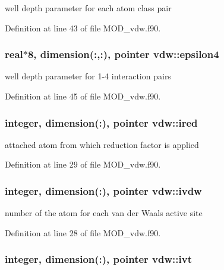 well depth parameter for each atom class pair 



Definition at line 43 of file M\-O\-D\-\_\-vdw.\-f90.

\hypertarget{classvdw_a10411acf35a5a3fdec626d2784b45f51}{
\subsubsection[{epsilon4}]{\setlength{\rightskip}{0pt plus 5cm}real$\ast$8, dimension(\-:,\-:), pointer vdw\-::epsilon4}}\label{classvdw_a10411acf35a5a3fdec626d2784b45f51}


well depth parameter for 1-\/4 interaction pairs 



Definition at line 45 of file M\-O\-D\-\_\-vdw.\-f90.

\hypertarget{classvdw_ae2633d0f849d0257b457b77aff4b7fbd}{
\subsubsection[{ired}]{\setlength{\rightskip}{0pt plus 5cm}integer, dimension(\-:), pointer vdw\-::ired}}\label{classvdw_ae2633d0f849d0257b457b77aff4b7fbd}


attached atom from which reduction factor is applied 



Definition at line 29 of file M\-O\-D\-\_\-vdw.\-f90.

\hypertarget{classvdw_abb457d49a4b465ca67c7f2611dd88331}{
\subsubsection[{ivdw}]{\setlength{\rightskip}{0pt plus 5cm}integer, dimension(\-:), pointer vdw\-::ivdw}}\label{classvdw_abb457d49a4b465ca67c7f2611dd88331}


number of the atom for each van der Waals active site 



Definition at line 28 of file M\-O\-D\-\_\-vdw.\-f90.

\hypertarget{classvdw_a7820644a836b2f500bd9ca9a209b8618}{
\subsubsection[{ivt}]{\setlength{\rightskip}{0pt plus 5cm}integer, dimension(\-:), pointer vdw\-::ivt}}\label{classvdw_a7820644a836b2f500bd9ca9a209b8618}


